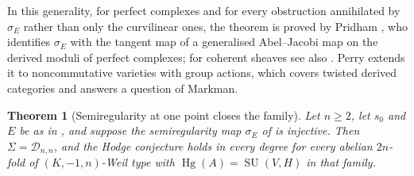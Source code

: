 \documentclass[11pt,reqno]{amsart}
\theoremstyle{plain}
\newtheorem{theorem}{Theorem}[section]
\theoremstyle{definition}
\theoremstyle{remark}
\newcommand{\cD}{\mathcal{D}}
\DeclareMathOperator{\Hg}{Hg}
\DeclareMathOperator{\SU}{SU}
\begin{document}
In this generality, for perfect complexes and for every obstruction
annihilated by $\sigma_{E}$ rather than only the curvilinear ones, the
theorem is proved by Pridham \cite{Pri24}, who identifies $\sigma_{E}$ with the
tangent map of a generalised Abel--Jacobi map on the derived moduli of perfect
complexes; for coherent sheaves see also \cite{BLM23}. Perry \cite{Per26}
extends it to noncommutative varieties with group actions, which covers
twisted derived categories and answers a question of Markman.

\begin{theorem}[Semiregularity at one point closes the family]
\label{thm:semiregclosure}
Let $n\ge2$, let $s_{0}$ and $E$ be as in , and suppose the
semiregularity map $\sigma_{E}$ of  is injective. Then
$\Sigma=\cD_{n,n}$, and the Hodge conjecture holds in every degree for every
abelian $2n$-fold of $(K,-1,n)$-Weil type with $\Hg(A)=\SU(V,H)$ in that
family.
\end{theorem}
\end{document}
